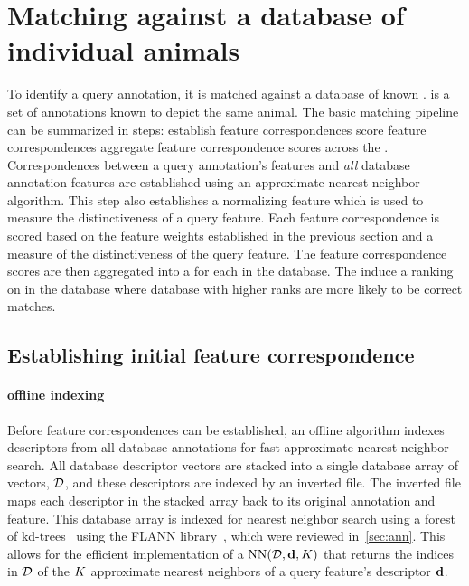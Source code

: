\section{Matching against a database of individual animals}\label{sec:baselineranking}

    To identify a query annotation, it is matched against a database of known \names{}. \Aan{\name{}} is a set of
    annotations known to depict the same animal. The basic matching pipeline can be summarized in \three{} steps:
    establish feature correspondences \rpipe{} %
    score feature correspondences \rpipe{} %
    aggregate feature correspondence scores across the \names{}. Correspondences between a query annotation's
    features and \emph{all} database annotation features are established using an approximate nearest neighbor
    algorithm. This step also establishes a normalizing feature which is used to measure the distinctiveness of a
    query feature. Each feature correspondence is scored based on the feature weights established in the previous
    section and a measure of the distinctiveness of the query feature. The feature correspondence scores are then
    aggregated into a \glossterm{\namescore{}} for each \name{} in the database. The \namescores{} induce a ranking
    on \names{} in the database where database \names{} with higher ranks are more likely to be correct matches.

   \subsection{Establishing initial feature correspondence}\label{sub:featmatch}

        \paragraph{offline indexing}
            Before feature correspondences can be established, an offline algorithm indexes descriptors from all
            database annotations for fast approximate nearest neighbor search. All database descriptor vectors are
            stacked into a single database array of vectors, %
            $\mathcal{D}$, %
            and these descriptors are indexed by an inverted file. The inverted file maps each descriptor in the
            stacked array back to its original annotation and feature. This database array is indexed for nearest
            neighbor search using a forest of kd-trees~\cite{silpa_anan_optimised_2008} using the FLANN
            library~\cite{muja_fast_2009}, which were reviewed in~\cref{sec:ann}. This allows for the efficient
            implementation of a   %
            $\operatorname{NN}(\mathcal{D}, \mathbf{d}, K)$  %
            that returns the indices in $\mathcal{D}$ of the $K$ approximate nearest neighbors of a query feature's
            descriptor $\mathbf{d}$.

